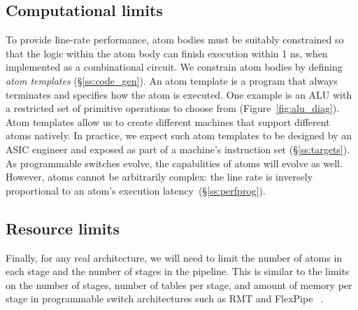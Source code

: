 \subsection{Computational limits}
\label{s:atomConstraints}


To provide line-rate performance, atom bodies must be suitably constrained so
that the logic within the atom body can finish execution within 1 ns, when
implemented as a combinational circuit. We constrain atom bodies by defining
{\it atom templates} (\S\ref{ss:code_gen}).  An atom template is a program that
always terminates and specifies how the atom is executed. One example is an ALU
with a restricted set of primitive operations to choose from
(Figure~\ref{fig:alu_diag}). Atom templates allow us to create different
\absmachine machines that support different atoms natively.  In practice, we
expect such atom templates to be designed by an ASIC engineer and exposed as
part of a \absmachine machine's instruction set (\S\ref{ss:targets}). As
programmable switches evolve, the capabilities of atoms will evolve as well.
However, atoms cannot be arbitrarily complex: the line rate is inversely
proportional to an atom's execution latency~(\S\ref{ss:perfprog}).

\subsection{Resource limits}
\label{s:resource}

Finally, for any real architecture, we will need to limit the number of atoms
in each stage and the number of stages in the pipeline. This is similar to the
limits on the number of stages, number of tables per stage, and amount of
memory per stage in programmable switch architectures such as RMT and FlexPipe
~\cite{lavanya_compiler}.
